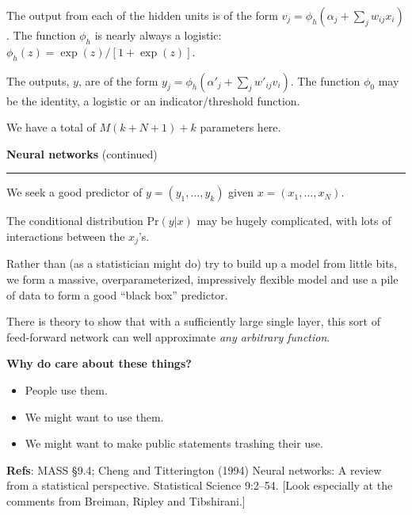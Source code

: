 \documentclass[12pt,letterpaper]{article}
\renewcommand{\Pr}{\text{Pr}}     %
\newcommand{\HRule}{\rule{\linewidth}{4pt}}
\newcommand{\vsphalf}{\vspace*{0.5cm}}
\begin{document}
The output from each of the hidden units is of the form $ v_j = \phi_h
( \alpha_j + \sum_j w_{ij} x_i )$.  The function $\phi_h$ is
nearly always a logistic: $\phi_h(z) = \exp(z)/[1+\exp(z)]$.

\bigskip

The outputs, $y$, are of the form $ y_j = \phi_h ( \alpha'_j + \sum_j
w'_{ij} v_i )$.  The function $\phi_0$ may be the identity, a
logistic or an indicator/threshold function.

\bigskip

We have a total of $M(k+N+1) + k$ parameters here. 



\newpage

\fontsize{30}{30} \selectfont

\centerline{\textbf{Neural networks} (continued)}

\HRule

\vsphalf

\fontsize{20}{25} \selectfont

We seek a good predictor of $y = (y_1, \ldots, y_k)$ given $x = (x_1,
\ldots, x_N)$.

\bigskip

The conditional distribution $\Pr(y | x)$
may be hugely complicated, with lots of interactions between the
$x_j$'s.  

\bigskip 

Rather than (as a statistician might do) try to build up a model
from little bits, we form a massive, overparameterized, impressively
flexible model and use a pile of data to form a good ``black box''
predictor.

\bigskip

There is theory to show that with a sufficiently large single layer,
this sort of feed-forward network can well approximate \emph{any
arbitrary function}.

\vsphalf

\textbf{Why do care about these things?}
\begin{itemize}
\item People use them.
\item We might want to use them.
\item We might want to make public statements trashing their use.
\end{itemize}

\vsphalf

\textbf{Refs}: MASS \S 9.4;
Cheng and Titterington (1994) Neural networks: A review from a
statistical perspective.  Statistical Science 9:2--54. [Look
especially at the comments from Breiman, Ripley and Tibshirani.]
\end{document}
